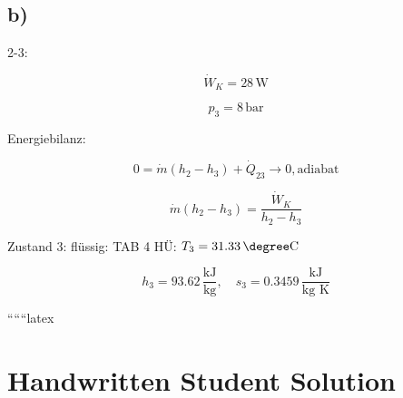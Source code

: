 

\subsection*{b)}

2-3:

\[
\dot{W}_K = 28 \, \text{W}
\]

\[
p_3 = 8 \, \text{bar}
\]

Energiebilanz:

\[
0 = \dot{m} (h_2 - h_3) + \dot{Q}_{23} \rightarrow 0, \text{adiabat}
\]

\[
\dot{m} (h_2 - h_3) = \frac{\dot{W}_K}{h_2 - h_3}
\]

Zustand 3: flüssig: TAB 4 HÜ: \(T_3 = 31.33 \, \degree \text{C}\)

\[
h_3 = 93.62 \, \frac{\text{kJ}}{\text{kg}}, \quad s_3 = 0.3459 \, \frac{\text{kJ}}{\text{kg K}}
\]

``````latex

\section*{Handwritten Student Solution}